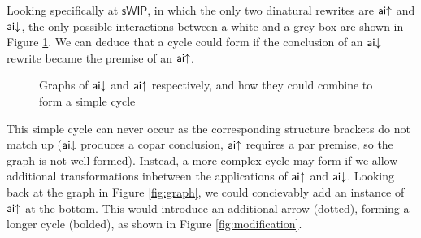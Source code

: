 \documentclass[11pt, oneside]{article}
\theoremstyle{plain}
\theoremstyle{definition}
\newcommand{\sSys}{{\mathsf{sWIP}}}%
\begin{document}
Looking specifically at $\sSys$, in which the only two dinatural rewrites are ${\mathsf {ai}}{ \uparrow}$ and ${\mathsf {ai}}{\downarrow}$, the only possible interactions between a white and a grey box are shown in Figure \ref{fig:cycles}.
We can deduce that a cycle could form if the conclusion of an ${\mathsf {ai}}{\downarrow}$ rewrite became the premise of an ${\mathsf {ai}}{ \uparrow}$.
\begin{figure}[ht]
    \begin{minipage}[h]{0.3\textwidth}
        \centering
    \end{minipage}
    \hfill
    \begin{minipage}[h]{0.3\textwidth}
        \centering
    \end{minipage}
    \hfill
    \begin{minipage}[h]{0.3\textwidth}
        \centering
    \end{minipage}

    \caption{Graphs of ${\mathsf {ai}}{\downarrow}$ and ${\mathsf {ai}}{ \uparrow}$ respectively, and how they could combine to form a simple cycle}
    \label{fig:cycles}
\end{figure}

This simple cycle can never occur as the corresponding structure brackets do not match up (${\mathsf {ai}}{\downarrow}$ produces a copar conclusion, ${\mathsf {ai}}{ \uparrow}$ requires a par premise, so the graph is not well-formed).
Instead, a more complex cycle may form if we allow additional transformations inbetween the applications of ${\mathsf {ai}}{ \uparrow}$ and ${\mathsf {ai}}{\downarrow}$.
Looking back at the graph in Figure \ref{fig:graph}, we could concievably add an instance of ${\mathsf {ai}}{ \uparrow}$ at the bottom.
This would introduce an additional arrow (dotted), forming a longer cycle (bolded), as shown in Figure \ref{fig:modification}.
\end{document}
